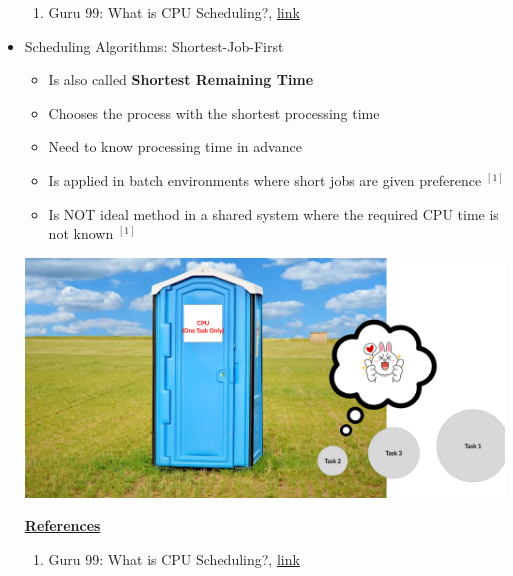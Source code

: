 \documentclass[12pt]{article}
\begin{document}
\begin{itemize}
    \begin{enumerate}[1)]
        \item Guru 99: What is CPU Scheduling?, \href{https://www.guru99.com/cpu-scheduling-algorithms.html#8}{link}
    \end{enumerate}

    \item Scheduling Algorithms: Shortest-Job-First
    \begin{itemize}
        \item Is also called \textbf{Shortest Remaining Time}
        \item Chooses the process with the shortest processing time
        \item Need to know processing time in advance
        \item Is applied in batch environments where short jobs are given preference $^{[1]}$
        \item Is NOT ideal method in a shared system where the required CPU time
        is not known $^{[1]}$
    \end{itemize}

    \bigskip

    \begin{center}
    \includegraphics[width=0.8\linewidth]{../images/week_4_notes_1_2.png}
    \end{center}

    \underline{\textbf{References}}

    \begin{enumerate}[1)]
        \item Guru 99: What is CPU Scheduling?, \href{https://www.guru99.com/cpu-scheduling-algorithms.html#8}{link}
    \end{enumerate}


\end{itemize}
\end{document}
